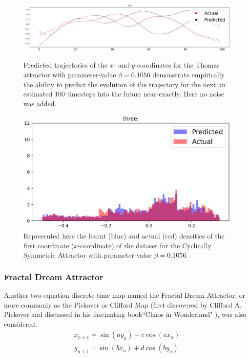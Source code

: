 \begin{figure}[ht]
  \centering
  \includegraphics[scale=0.35]{Graphs/_Thomas_1.eps}\caption*{Predicted trajectories of the $x$- and $y$-coordinates for the Thomas attractor with parameter-value $\beta=0.1056$ demonstrate empirically the ability to predict the evolution of the trajectory for the next an estimated 100 timesteps into the future near-exactly. Here no noise was added.}
  \includegraphics[scale=0.5]{Graphs/_Thomas_3.eps}\caption*{Represented here the learnt (blue) and actual (red) densities of the first coordinate ($x$-coordinate) of the dataset for the Cyclically Symmetric Attractor with parameter-value $\beta=0.1056$.}
\end{figure}


\subsubsection{Fractal Dream Attractor}

Another two-equation discrete-time map named the Fractal Dream Attractor, or more commonly as the Pickover or Clifford Map (first discovered by Clifford A. Pickover and discussed in his fascinating book``Chaos in Wonderland" \cite{PickoverChaos}), was also considered.
\begin{eqnarray}\label{eqns_clifford}
  {x_{n+1}=\sin(ay_n) + c\cos(ax_n)} \\
  {y_{n+1}=\sin(bx_n)+d\cos(by_n)}
\end{eqnarray}

